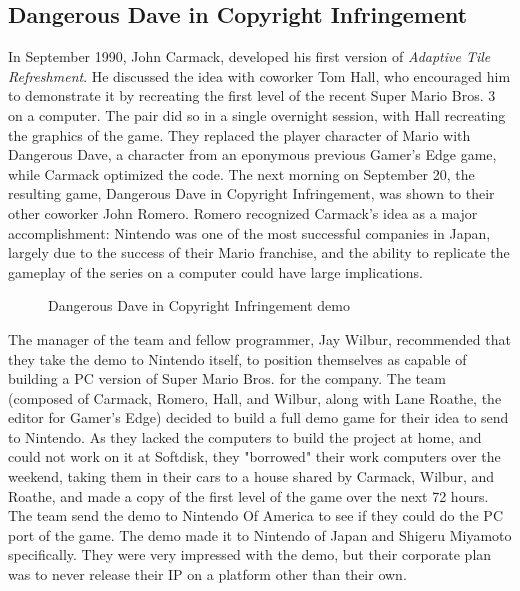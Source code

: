 \documentclass[book.tex]{subfiles}
\begin{document}
\subsection{Dangerous Dave in Copyright Infringement}
In September 1990, John Carmack, developed his first version of \textit{Adaptive Tile Refreshment}. He discussed the idea with coworker Tom Hall, who encouraged him to demonstrate it by recreating the first level of the recent Super Mario Bros. 3 on a computer. The pair did so in a single overnight session, with Hall recreating the graphics of the game. They replaced the player character of Mario with Dangerous Dave, a character from an eponymous previous Gamer's Edge game, while Carmack optimized the code. The next morning on September 20, the resulting game, Dangerous Dave in Copyright Infringement, was shown to their other coworker John Romero. Romero recognized Carmack's idea as a major accomplishment: Nintendo was one of the most successful companies in Japan, largely due to the success of their Mario franchise, and the ability to replicate the gameplay of the series on a computer could have large implications.\\

\begin{figure}[H]
\centering
 \caption{Dangerous Dave in Copyright Infringement demo}
 \label{fig:ddici}
\end{figure}

\par
The manager of the team and fellow programmer, Jay Wilbur, recommended that they take the demo to Nintendo itself, to position themselves as capable of building a PC version of Super Mario Bros. for the company. The team (composed of Carmack, Romero, Hall, and Wilbur, along with Lane Roathe, the editor for Gamer's Edge) decided to build a full demo game for their idea to send to Nintendo. As they lacked the computers to build the project at home, and could not work on it at Softdisk, they "borrowed" their work computers over the weekend, taking them in their cars to a house shared by Carmack, Wilbur, and Roathe, and made a copy of the first level of the game over the next 72 hours. The team send the demo to Nintendo Of America to see if they could do the PC port of the game. The demo made it to Nintendo of Japan and Shigeru Miyamoto specifically. They were very impressed with the demo, but their corporate plan was to never release their IP on a platform other than their own.\\
\end{document}
